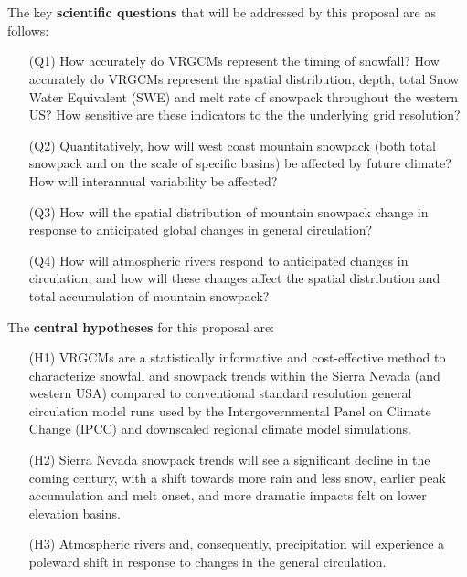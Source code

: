 \documentclass[11pt]{article}
\begin{document}
\\\\
The key \textbf{scientific questions} that will be addressed by this proposal are as follows:

\vspace{-0.4cm}
\begin{itemize}
\item[(Q1)] How accurately do VRGCMs represent the timing of snowfall?  How accurately do VRGCMs represent the spatial distribution, depth, total Snow Water Equivalent (SWE) and melt rate of snowpack throughout the western US?  How sensitive are these indicators to the the underlying grid resolution?

\item[(Q2)] Quantitatively, how will west coast mountain snowpack (both total snowpack and on the scale of specific basins) be affected by future climate?  How will interannual variability be affected?

\item[(Q3)] How will the spatial distribution of mountain snowpack change in response to anticipated global changes in general circulation?

\item[(Q4)] How will atmospheric rivers respond to anticipated changes in circulation, and how will these changes affect the spatial distribution and total accumulation of mountain snowpack?
\end{itemize}

\noindent The \textbf{central hypotheses} for this proposal are:

\vspace{-0.4cm}
\begin{itemize}
\item[(H1)] VRGCMs are a statistically informative and cost-effective method to characterize snowfall and snowpack trends within the Sierra Nevada (and western USA) compared to conventional standard resolution general circulation model runs used by the Intergovernmental Panel on Climate Change (IPCC) and downscaled regional climate model simulations.
\item[(H2)] Sierra Nevada snowpack trends will see a significant decline in the coming century, with a shift towards more rain and less snow, earlier peak accumulation and melt onset, and more dramatic impacts felt on lower elevation basins.
\item[(H3)] Atmospheric rivers and, consequently, precipitation will experience a poleward shift in response to changes in the general circulation.
\end{itemize}
\end{document}
